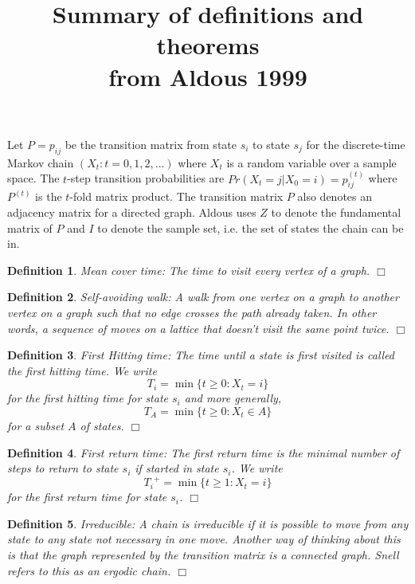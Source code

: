 \documentclass[11pt, letterpaper]{article}
\newenvironment{definition}
{\noindent\begin{defn}}
{\hfill $\Box$ \end{defn}}
\newtheorem{defn}{Definition}
\begin{document}
\title{Summary of definitions and theorems\\from Aldous 1999}
\maketitle

Let $P = p_{ij}$ be the transition matrix from state $s_i$ to state $s_j$ for the discrete-time Markov chain $(X_t : t = 0, 1, 2, ...)$ where $X_t$ is a random variable over a sample space.  The $t$-step transition probabilities are $Pr(X_t = j | X_0 = i) = p^{(t)}_{ij}$ where $P^{(t)}$ is the $t$-fold matrix product.  The transition matrix $P$ also denotes an adjacency matrix for a directed graph.  Aldous uses $Z$ to denote the fundamental matrix of $P$ and $I$ to denote the sample set, i.e. the set of states the chain can be in.

\begin{definition}
\textit{Mean cover time}: The time to visit every vertex of a graph.
\end{definition}

\begin{definition}
\textit{Self-avoiding walk}: A walk from one vertex on a graph to another vertex on a graph such that no edge crosses the path already taken.  In other words, a sequence of moves on a lattice that doesn't visit the same point twice.
\end{definition}


\begin{definition}
\textit{First Hitting time}:  The time until a state is first visited is called the \textit{first hitting time}.  We write 
\[
	T_i = \min \{ t \ge 0 : X_t = i\}
\]
for the first hitting time for state $s_i$ and more generally,
\[
	T_A = \min \{ t \ge 0 : X_t \in A \}
\]
for a subset $A$ of states.
\end{definition}

\begin{definition}
\textit{First return time}: The first return time is the minimal number of steps to return to state $s_i$ if started in state $s_i$.  We write
\[
	{T_i}^+ = \min \{ t \ge 1 : X_t = i \}
\]
for the first return time for state $s_i$.
\end{definition}


\begin{definition}
\textit{Irreducible}: A chain is \textit{irreducible} if it is possible to move from any state to any state not necessary in one move.  Another way of thinking about this is that the graph represented by the transition matrix is a connected graph.  Snell refers to this as an \textit{ergodic} chain.
\end{definition}
\end{document}
